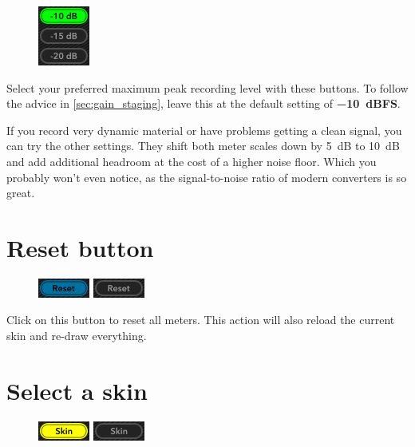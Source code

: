 \begin{figure}
\includegraphics[scale=\screenshotscale,clip]{include/images/button_recording_level.png}
\end{figure}

Select your preferred maximum peak recording level with these buttons.
To follow the advice in \ref{sec:gain_staging}, leave this at the
default setting of \textbf{\SI{-10}{dBFS}}.

If you record very dynamic material or have problems getting a clean
signal, you can try the other settings.  They shift both meter scales
down by \SI{5}{dB} to \SI{10}{dB} and add additional headroom at the
cost of a higher noise floor.  Which you probably won't even notice,
as the signal-to-noise ratio of modern converters is so great.

\section{Reset button}
\label{sec:reset_button}

\begin{figure}
\includegraphics[scale=\screenshotscale,clip]{include/images/button_reset_on.png}
\newline \vspace{-0.9\baselineskip}
\includegraphics[scale=\screenshotscale,clip]{include/images/button_reset_off.png}
\end{figure}

Click on this button to reset all meters.  This action will also
reload the current skin and re-draw everything.

\section{Select a skin}

\begin{figure}
\includegraphics[scale=\screenshotscale,clip]{include/images/button_skin_on.png}
\newline \vspace{-0.9\baselineskip}
\includegraphics[scale=\screenshotscale,clip]{include/images/button_skin_off.png}
\end{figure}

